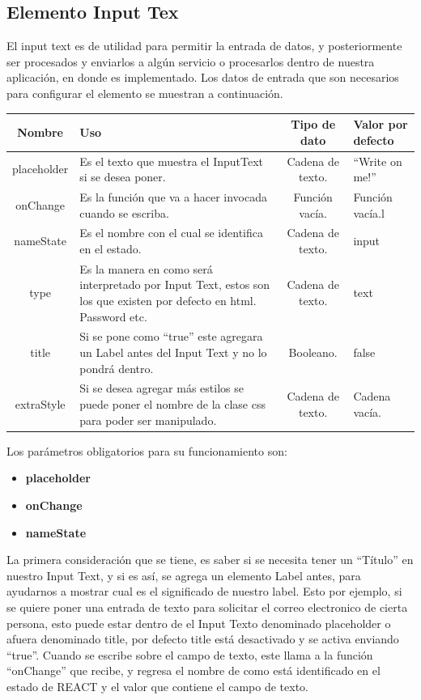 \subsection{Elemento Input Tex}
El input text es de utilidad para permitir la entrada de datos, y posteriormente ser procesados y enviarlos a algún servicio o procesarlos dentro de nuestra aplicación, en donde es implementado.
Los datos de entrada que son necesarios para configurar el elemento se muestran a continuación.
\newline
\newline
\begin{center}
 \begin{tabular}{ | c |  p{5cm}  | c | p{3cm} |} 
 \hline
 \textbf{Nombre} &  \textbf{Uso} &  \textbf{ Tipo de dato} &  \textbf{Valor por defecto}\\ [0.5ex] 
 \hline\hline
placeholder &Es el texto que muestra el InputText si se desea poner.  &  Cadena de texto. 	& “Write on me!” \\  [2.5ex] 
 \hline
onChange & Es la función que va a hacer invocada cuando se escriba.     & Función vacía.  	& Función vacía.l \\[2.5ex] 
 \hline
nameState & Es el nombre con el cual se identifica en el estado.    & Cadena de texto.	& input \\[3.5ex] 
 \hline
 type   & Es la manera en como será interpretado por Input Text, estos son los que existen por defecto en html. Password etc.&  Cadena de texto.	& text \\[2.5ex] 
 \hline
 title  & Si se pone como “true” este agregara un Label antes del Input Text y no lo pondrá dentro.&  Booleano.	& false \\[2.5ex] 
 \hline
 extraStyle   & Si se desea agregar más estilos se puede poner el nombre de la clase css para poder ser manipulado.&  Cadena de texto. 	& Cadena vacía. \\[2.5ex] 
 \hline
\end{tabular}
\end{center}
\newline
\newline
Los parámetros obligatorios para su funcionamiento son:
\begin{itemize}
\item \textbf{placeholder} 
\item \textbf{onChange} 
\item \textbf{nameState} 
\end{itemize}
\newline
\newline
La primera consideración que se tiene, es saber si se necesita tener un “Título” en nuestro Input Text, y si es así, se agrega un elemento Label antes,  para ayudarnos a mostrar cual es el significado de nuestro label. Esto por ejemplo, si se quiere poner una entrada de texto para solicitar el correo electronico de cierta persona, esto puede estar dentro de el Input Texto denominado placeholder o afuera denominado title, por defecto title está desactivado y se activa enviando “true”.
Cuando se escribe sobre el campo de texto, este llama a la función “onChange” que recibe, y regresa el nombre de como está identificado en el estado de REACT y el valor que contiene el campo de texto.

